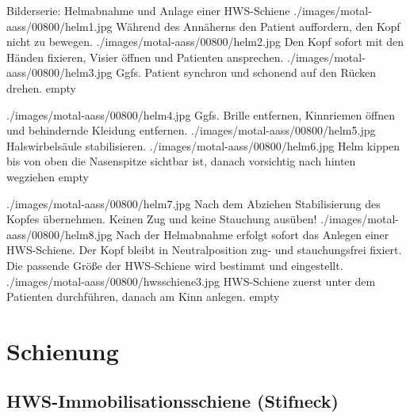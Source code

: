 \documentclass[
ngerman,
paper=a4,
asymmetric,
fontsize=8pt,
draft=false,
numbers=noenddot,
bibtotocnumbered,
footnotes=multiple,
toc=flat,
]{scrbook}
\begin{document}
\begin{PictureSeriesWide}{}{Bilderserie: Helmabnahme und Anlage
einer HWS-Schiene \label{fig:helmabnahme-hws-schiene}\label{fig:hws-schiene-anlegen}}
{./images/motal-aass/00800/helm1.jpg}%
{Während des Annäherns den Patient auffordern, den Kopf nicht zu bewegen.}
{./images/motal-aass/00800/helm2.jpg}%
{Den Kopf sofort mit den Händen fixieren, Visier öffnen und Patienten ansprechen.}
{./images/motal-aass/00800/helm3.jpg}%
{Ggfs. Patient synchron und schonend auf den Rücken drehen.}
{empty}%
{}

{./images/motal-aass/00800/helm4.jpg}%
{Ggfs. Brille entfernen, Kinnriemen öffnen und behindernde
Kleidung entfernen.}
{./images/motal-aass/00800/helm5.jpg}%
{Halswirbelsäule stabilisieren.}
{./images/motal-aass/00800/helm6.jpg}%
{Helm kippen bis von oben die Nasenspitze sichtbar ist,
danach vorsichtig nach hinten wegziehen}
{empty}%
{}

{./images/motal-aass/00800/helm7.jpg}%
{Nach dem Abziehen Stabilisierung des Kopfes übernehmen. Keinen Zug und keine Stauchung ausüben!}
{./images/motal-aass/00800/helm8.jpg}%
{Nach der Helmabnahme erfolgt sofort das Anlegen einer
HWS-Schiene. Der Kopf bleibt in Neutralposition zug- und
stauchungsfrei fixiert. Die passende Größe der HWS-Schiene
wird bestimmt und eingestellt.}
{./images/motal-aass/00800/hwsschiene3.jpg}%
{HWS-Schiene zuerst unter dem Patienten durchführen, danach
am Kinn anlegen.}
{empty}%
{}
\end{PictureSeriesWide}




\needspace{0.5\textheight}
\section{Schienung}
\label{topic:schienung}\label{topic:schienungsmaterial}

\subsection{HWS-Immobilisationsschiene (Stifneck\texttrademark)}
\label{topic:hws-schiene-anlegen}
\label{topic:hws-schiene-beschreibung}

\end{document}
